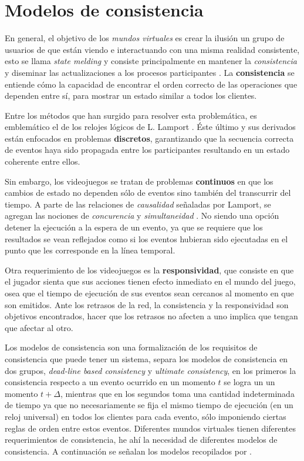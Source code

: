 \section{Modelos de consistencia}


En general, el objetivo de los \emph{mundos virtuales} es crear la ilusión un grupo de usuarios de que están viendo e interactuando con una misma realidad consistente, esto se llama \emph{state melding} y consiste principalmente en mantener la \emph{consistencia} y diseminar las actualizaciones a los procesos participantes \cite{liu2012survey}. La \textbf{consistencia} se entiende cómo la capacidad de encontrar el orden correcto de las operaciones que dependen entre sí, para mostrar un estado similar a todos los clientes.

Entre los métodos que han surgido para resolver esta problemática, es emblemático el de los relojes lógicos de L. Lamport \cite{lamport1978time}. Éste último y sus derivados están enfocados en problemas \textbf{discretos}, garantizando que la secuencia correcta de eventos haya sido propagada entre los participantes resultando en un estado coherente entre ellos.

Sin embargo, los videojuegos se tratan de problemas \textbf{continuos} en que los cambios de estado no dependen sólo de eventos sino también del transcurrir del tiempo. A parte de las relaciones de \emph{causalidad} señaladas por Lamport, se agregan las nociones de \emph{concurencia} y \emph{simultaneidad} \cite{liu2012survey}. No siendo una opción detener la ejecución a la espera de un evento, ya que se requiere que los resultados se vean reflejados como si los eventos hubieran sido ejecutadas en el punto que les corresponde en la línea temporal\cite{mauve2004local}.

Otra requerimiento de los videojuegos es la \textbf{responsividad}, que consiste en que el jugador sienta que sus acciones tienen efecto inmediato en el mundo del juego, osea que el tiempo de ejecución de sus eventos sean cercanos al momento en que son emitidos. Ante los retrasos de la red, la consistencia y la responsividad son objetivos encontrados, hacer que los retrasos no afecten a uno implica que tengan que afectar al otro.

Los modelos de consistencia son una formalización de los requisitos de consistencia que puede tener un sistema, \cite{liu2012survey} separa los modelos de consistencia en dos grupos, \emph{dead-line based consistency} y \emph{ultimate consistency}, en los primeros la consistencia respecto a un evento ocurrido en un momento $t$ se logra un un momento $t+\Delta$, mientras que en los segundos toma una cantidad indeterminada de tiempo ya que no necesariamente se fija el mismo tiempo de ejecución (en un reloj universal) en todos los clientes para cada evento, sólo imponiendo ciertas reglas de orden entre estos eventos. Diferentes mundos virtuales tienen diferentes requerimientos de consistencia, he ahí la necesidad de diferentes modelos de consistencia. A continuación se señalan los modelos recopilados por \cite{liu2012survey}.

